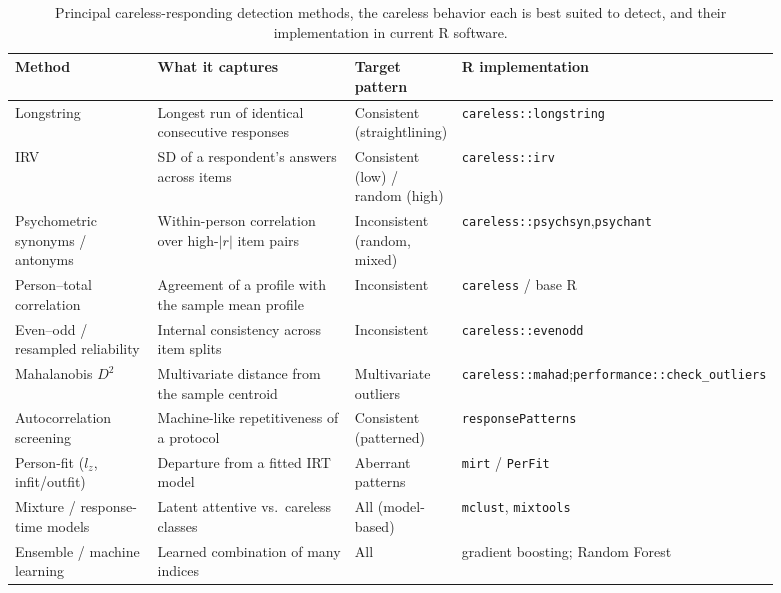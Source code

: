 \documentclass[doc,11pt,donotrepeattitle]{apa7}
\begin{document}
\begin{table}[t]
\centering
\caption{Principal careless-responding detection methods, the careless
behavior each is best suited to detect, and their implementation in current
\textsf{R} software.}
\label{tab:indices}
\footnotesize
\begin{tabular}{L{0.20\linewidth} L{0.30\linewidth} L{0.14\linewidth} L{0.25\linewidth}}
\toprule
\textbf{Method} & \textbf{What it captures} & \textbf{Target pattern} & \textbf{R implementation} \\
\midrule
Longstring & Longest run of identical consecutive responses & Consistent (straightlining) & \texttt{careless::\allowbreak longstring} \\
IRV & SD of a respondent's answers across items & Consistent (low) / random (high) & \texttt{careless::\allowbreak irv} \\
Psychometric synonyms / antonyms & Within-person correlation over high-$|r|$ item pairs & Inconsistent (random, mixed) & \texttt{careless::\allowbreak psychsyn},\newline \texttt{psychant} \\
Person--total correlation & Agreement of a profile with the sample mean profile & Inconsistent & \texttt{careless} / base \textsf{R} \\
Even--odd / resampled reliability & Internal consistency across item splits & Inconsistent & \texttt{careless::\allowbreak evenodd} \\
Mahalanobis $D^2$ & Multivariate distance from the sample centroid & Multivariate outliers & \texttt{careless::\allowbreak mahad};\newline \texttt{performance::\allowbreak check\_outliers} \\
Autocorrelation screening & Machine-like repetitiveness of a protocol & Consistent (patterned) & \texttt{responsePatterns} \\
Person-fit ($l_z$, infit/outfit) & Departure from a fitted IRT model & Aberrant patterns & \texttt{mirt} / \texttt{PerFit} \\
Mixture / response-time models & Latent attentive vs.\ careless classes & All (model-based) & \texttt{mclust}, \texttt{mixtools} \\
Ensemble / machine learning & Learned combination of many indices & All & gradient boosting; Random Forest \\
\bottomrule
\end{tabular}
\end{table}
\end{document}
